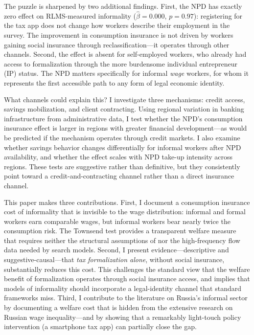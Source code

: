 \documentclass[12pt]{article}
\begin{document}
The puzzle is sharpened by two additional findings. First, the NPD has exactly zero effect on RLMS-measured informality ($\hat{\beta} = 0.000$, $p = 0.97$): registering for the tax app does not change how workers describe their employment in the survey. The improvement in consumption insurance is not driven by workers gaining social insurance through reclassification---it operates through other channels. Second, the effect is absent for self-employed workers, who already had access to formalization through the more burdensome individual entrepreneur (IP) status. The NPD matters specifically for informal \textit{wage} workers, for whom it represents the first accessible path to any form of legal economic identity.

What channels could explain this? I investigate three mechanisms: credit access, savings mobilization, and client contracting. Using regional variation in banking infrastructure from administrative data, I test whether the NPD's consumption insurance effect is larger in regions with greater financial development---as would be predicted if the mechanism operates through credit markets. I also examine whether savings behavior changes differentially for informal workers after NPD availability, and whether the effect scales with NPD take-up intensity across regions. These tests are suggestive rather than definitive, but they consistently point toward a credit-and-contracting channel rather than a direct insurance channel.

This paper makes three contributions. First, I document a consumption insurance cost of informality that is invisible to the wage distribution: informal and formal workers earn comparable wages, but informal workers bear nearly twice the consumption risk. The Townsend test provides a transparent welfare measure that requires neither the structural assumptions of \citet{Ulyssea2018} nor the high-frequency flow data needed by search models. Second, I present evidence---descriptive and suggestive-causal---that \textit{tax formalization alone}, without social insurance, substantially reduces this cost. This challenges the standard view that the welfare benefit of formalization operates through social insurance access, and implies that models of informality should incorporate a legal-identity channel that standard frameworks miss. Third, I contribute to the literature on Russia's informal sector \citep{GimpelsonKapeliushnikov2014, LehmannZaiceva2013} by documenting a welfare cost that is hidden from the extensive research on Russian wage inequality---and by showing that a remarkably light-touch policy intervention (a smartphone tax app) can partially close the gap.
\end{document}
